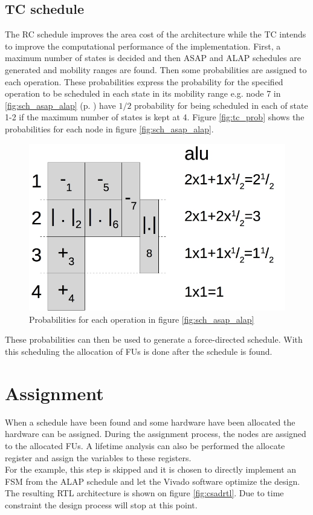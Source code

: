 \subsection{TC schedule}
The RC schedule improves the area cost of the architecture while the TC intends to improve the computational performance of the implementation. First, a maximum number of states is decided and then ASAP and ALAP schedules are generated and mobility ranges are found. Then some probabilities are assigned to each operation. These probabilities express the probability for the specified operation to be scheduled in each state in its mobility range e.g. node 7 in \ref{fig:sch_asap_alap} (p. \pageref{fig:sch_asap_alap}) have $1/2$ probability for being scheduled in each of state 1-2 if the maximum number of states is kept at 4. Figure \vref{fig:tc_prob} shows the probabilities for each node in figure \vref{fig:sch_asap_alap}.\\
\begin{figure}[ht!]
  \centering
  \includegraphics[scale=0.4]{figures/tccsadprop}
  \caption{Probabilities for each operation in figure \vref{fig:sch_asap_alap}}
  \label{fig:tc_prob}
\end{figure}

These probabilities can then be used to generate a force-directed schedule. With this scheduling the allocation of FUs is done after the schedule is found. 

\section{Assignment}
When a schedule have been found and some hardware have been allocated the hardware can be assigned. During the assignment process, the nodes are assigned to the allocated FUs. A lifetime analysis can also be performed the allocate register and assign the variables to these registers.\\
For the example, this step is skipped and it is chosen to directly implement an FSM from the ALAP schedule and let the Vivado software optimize the design. The resulting RTL architecture is shown on figure \vref{fig:csadrtl}. Due to time constraint the design process will stop at this point.
 
